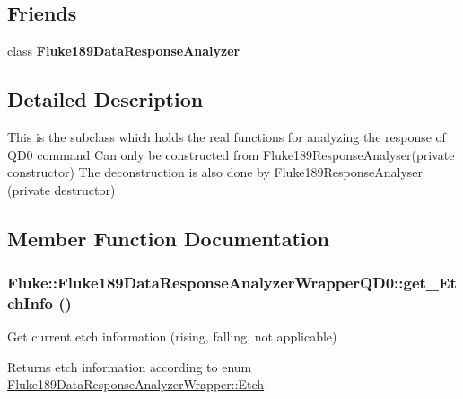 \subsection*{Friends}
\begin{DoxyCompactItemize}
\item 
\hypertarget{classFluke_1_1Fluke189DataResponseAnalyzerWrapperQD0_a268eb1bf9fac46f61af93c2c1e309713}{
class {\bfseries Fluke189DataResponseAnalyzer}}
\label{classFluke_1_1Fluke189DataResponseAnalyzerWrapperQD0_a268eb1bf9fac46f61af93c2c1e309713}

\end{DoxyCompactItemize}


\subsection{Detailed Description}
This is the subclass which holds the real functions for analyzing the response of QD0 command Can only be constructed from Fluke189ResponseAnalyser(private constructor) The deconstruction is also done by Fluke189ResponseAnalyser (private destructor) 

\subsection{Member Function Documentation}
\hypertarget{classFluke_1_1Fluke189DataResponseAnalyzerWrapperQD0_a8a50c55ebd21461e4c934a1eb4b07641}{
\subsubsection[{get\_\-EtchInfo}]{ Fluke::Fluke189DataResponseAnalyzerWrapperQD0::get\_\-EtchInfo ()}}
\label{classFluke_1_1Fluke189DataResponseAnalyzerWrapperQD0_a8a50c55ebd21461e4c934a1eb4b07641}
Get current etch information (rising, falling, not applicable) \begin{DoxyReturn}{Returns}
etch information according to enum \hyperlink{classFluke_1_1Fluke189DataResponseAnalyzerWrapper_ada71f6ab32a7b0eb40bb0ed96d7053bc}{Fluke189DataResponseAnalyzerWrapper::Etch} 
\end{DoxyReturn}


